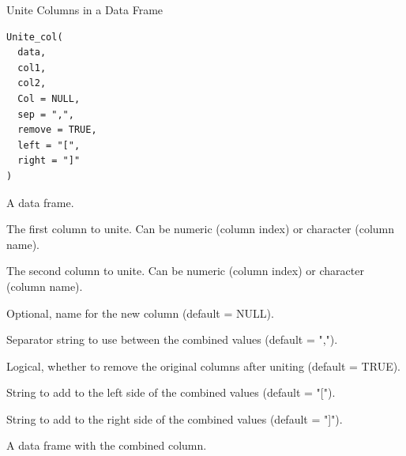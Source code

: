 \documentclass[a4paper]{book}
\begin{document}
%
\begin{Description}
Unite Columns in a Data Frame
\end{Description}
%
\begin{Usage}
\begin{verbatim}
Unite_col(
  data,
  col1,
  col2,
  Col = NULL,
  sep = ",",
  remove = TRUE,
  left = "[",
  right = "]"
)
\end{verbatim}
\end{Usage}
%
\begin{Arguments}
\begin{ldescription}
\item[\code{data}] A data frame.

\item[\code{col1}] The first column to unite. Can be numeric (column index) or character (column name).

\item[\code{col2}] The second column to unite. Can be numeric (column index) or character (column name).

\item[\code{Col}] Optional, name for the new column (default = NULL).

\item[\code{sep}] Separator string to use between the combined values (default = ",").

\item[\code{remove}] Logical, whether to remove the original columns after uniting (default = TRUE).

\item[\code{left}] String to add to the left side of the combined values (default = "[").

\item[\code{right}] String to add to the right side of the combined values (default = "]").
\end{ldescription}
\end{Arguments}
%
\begin{Value}
A data frame with the combined column.
\end{Value}
%
\end{document}
